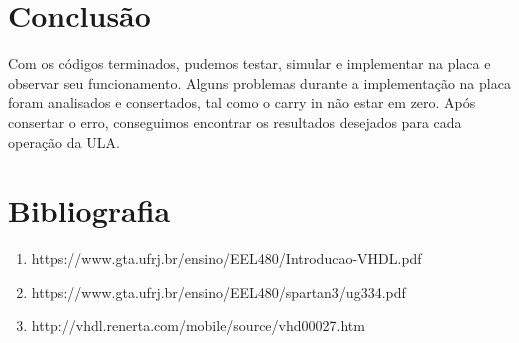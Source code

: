 \documentclass[a4paper,12pt,twoside]{article}
\begin{document}
\section{Conclusão}
    Com os códigos terminados, pudemos testar, simular e implementar na placa e observar seu funcionamento. Alguns problemas durante a implementação na placa foram analisados e consertados, tal como o carry in não estar em zero. Após consertar o erro, conseguimos encontrar os resultados desejados para cada operação da ULA.

\section{Bibliografia}
\begin{enumerate}
   \item https://www.gta.ufrj.br/ensino/EEL480/Introducao-VHDL.pdf
   \item https://www.gta.ufrj.br/ensino/EEL480/spartan3/ug334.pdf
   \item http://vhdl.renerta.com/mobile/source/vhd00027.htm
 \end{enumerate}
\end{document}
